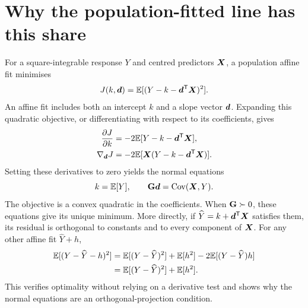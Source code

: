 \section{Why the population-fitted line has this share}
\label{gaussian:projection_section}

For a square-integrable response $Y$ and centred predictors $\boldsymbol{X}$, a
population affine fit minimises
\[
J(k,\boldsymbol{d})=\mathbb E[(Y-k-\boldsymbol{d}^{\mathsf T}\boldsymbol{X})^2].
\]
An affine fit includes both an intercept $k$ and a slope vector $\boldsymbol{d}$.
Expanding this quadratic objective, or differentiating with respect to its
coefficients, gives
\begin{align}
\frac{\partial J}{\partial k}
 &=-2\mathbb E[Y-k-\boldsymbol{d}^{\mathsf T}\boldsymbol{X}],\nonumber\\
\nabla_{\boldsymbol{d}}J
 &=-2\mathbb E[\boldsymbol{X}(Y-k-\boldsymbol{d}^{\mathsf T}\boldsymbol{X})].
\end{align}
Setting these derivatives to zero yields the normal equations
\begin{equation}
k=\mathbb E[Y],
\qquad
\mathbf{G}\boldsymbol{d}=\operatorname{Cov}(\boldsymbol{X},Y).
\label{gaussian:normal_equations}
\end{equation}
The objective is a convex quadratic in the coefficients. When
$\mathbf{G}\succ0$, these equations give its unique minimum. More directly,
if $\widehat Y=k+\boldsymbol{d}^{\mathsf T}\boldsymbol{X}$ satisfies them, its residual
is orthogonal to constants and to every component of $\boldsymbol{X}$. For any
other affine fit $\widehat Y+h$,
\begin{align}
\mathbb E[(Y-\widehat Y-h)^2]
 &=\mathbb E[(Y-\widehat Y)^2]+\mathbb E[h^2]
       -2\mathbb E[(Y-\widehat Y)h]\nonumber\\
 &=\mathbb E[(Y-\widehat Y)^2]+\mathbb E[h^2].
\end{align}
This verifies optimality without relying on a derivative test and shows why
the normal equations are an orthogonal-projection condition.

